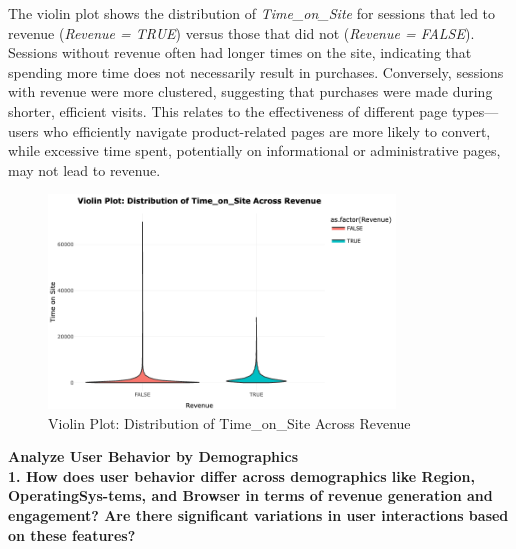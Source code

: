 \documentclass[12pt]{article}
\begin{document}
\FloatBarrier
The violin plot shows the distribution of \textit{Time\_on\_Site} for sessions that led to revenue (\textit{Revenue = TRUE}) versus those that did not (\textit{Revenue = FALSE}). Sessions without revenue often had longer times on the site, indicating that spending more time does not necessarily result in purchases. Conversely, sessions with revenue were more clustered, suggesting that purchases were made during shorter, efficient visits. This relates to the effectiveness of different page types—users who efficiently navigate product-related pages are more likely to convert, while excessive time spent, potentially on informational or administrative pages, may not lead to revenue.

\vspace{0.5cm}

\begin{figure}[h]
    \centering
    \includegraphics[width=0.82\textwidth]{violin plot distribution of time across site.png}  
    \caption{Violin Plot: Distribution of Time_on_Site Across Revenue}
\end{figure}


\newpage
\textbf{Analyze User Behavior by Demographics}\\

\textbf{1. How does user behavior differ across demographics like Region, OperatingSys-tems, and Browser in terms of revenue generation and engagement? Are there significant variations in user interactions based on these features?} \\[5pt] %
\end{document}
